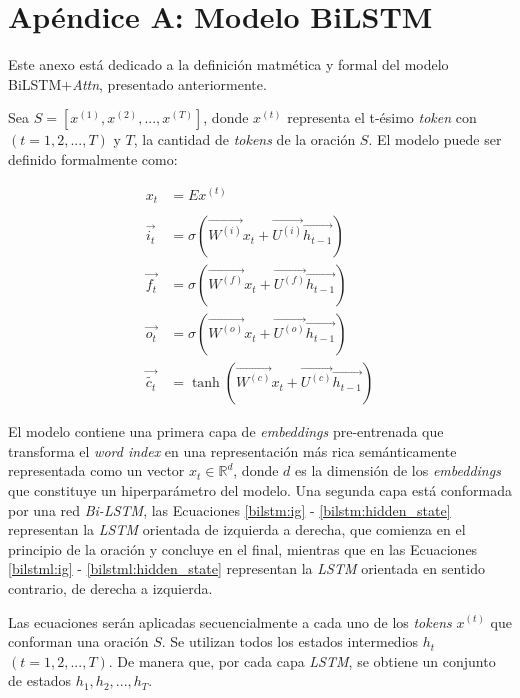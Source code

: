 \appendix
\chapter{Apéndice A: Modelo BiLSTM}\label{anex_1}

Este anexo está dedicado a la definición matmética y formal del modelo BiLSTM+\textit{Attn}, presentado anteriormente.

Sea $S = [x^{(1)}, x^{(2)}, ..., x^{(T)}]$, donde $x^{(t)}$ representa el t-ésimo \textit{token} con $(t = 1, 2, ..., T)$ y $T$, la cantidad de \textit{tokens} de la oración $S$. El modelo puede ser definido formalmente como:

\begin{align}
  x_{t} &= Ex^{(t)} \label{bilstm:emb}\\
  \nonumber \\
  \overrightarrow{i_{t}} &= \sigma{(\overrightarrow{W^{(i)}} x_{t} + \overrightarrow{U^{(i)}}\overrightarrow{h_{t-1}})} \label{bilstm:ig} \\
  \overrightarrow{f_{t}} &= \sigma{(\overrightarrow{W^{(f)}} x_{t} + \overrightarrow{U^{(f)}}\overrightarrow{h_{t-1}})} \label{bilstm:fg} \\
  \overrightarrow{o_{t}} &= \sigma{(\overrightarrow{W^{(o)}} x_{t} + \overrightarrow{U^{(o)}}\overrightarrow{h_{t-1}})} \label{bilstm:og} \\
  \overrightarrow{\tilde{c_{t}}} &= \tanh(\overrightarrow{W^{(c)}} x_{t} + \overrightarrow{U^{(c)}}\overrightarrow{h_{t-1}}) \label{bilstm:new_memory_cell}
\end{align}

El modelo contiene una primera capa de \textit{embeddings} pre-entrenada que transforma el \textit{word index} en una representación más rica semánticamente representada como un vector $x_{t} \in {\mathbb{R}} ^{d}$, donde $d$ es la dimensión de los \textit{embeddings} que constituye un hiperparámetro del modelo. Una segunda capa está conformada por una red \textit{Bi-LSTM}, las Ecuaciones \ref{bilstm:ig} - \ref{bilstm:hidden_state} representan la \textit{LSTM} orientada de izquierda a derecha, que comienza en el principio de la oración y concluye en el final, mientras que en las Ecuaciones \ref{bilstml:ig} - \ref{bilstml:hidden_state} representan la \textit{LSTM} orientada en sentido contrario, de derecha a izquierda. 

Las ecuaciones serán aplicadas secuencialmente a cada uno de los \textit{tokens} $x^{(t)}$ que conforman una oración $S$. Se utilizan todos los estados intermedios $h_{t}$  $(t = 1, 2, ..., T)$. De manera que, por cada capa \textit{LSTM}, se obtiene un conjunto de estados $h_{1}, h_{2}, ..., h_{T}$. 

